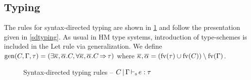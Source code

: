 \subsection{Typing}

The rules for syntax-directed typing are shown in \cref{fig:syntax-directed-typing}
and follow the presentation given in \cref{sdtyping}.
As usual in HM type systems, introduction of type-schemes
is included in the {\sc Let} rule via generalization.
We define $\operatorname{\text{gen}}(C,\Gamma,\tau) =
(\exists \overline{\kappa_{{}}},\overline{\alpha_{{}}}.C,
\forall \overline{\kappa_{{}}},\overline{\alpha_{{}}}.C \operatorname{\Rightarrow} \tau)$
where
$\overline{\kappa_{{}}},\overline{\alpha_{{}}} = (\operatorname{fv}(\tau)\cup\operatorname{fv}(C))\setminus\operatorname{fv}(\Gamma)$.


\begin{figure*}[hbtp]
  
  \caption{Syntax-directed typing rules --
    $C \operatorname{|} \Gamma \operatorname{\vdash_s} e : \tau$}
  \label{fig:syntax-directed-typing}
\end{figure*}

